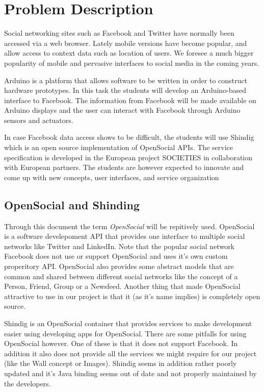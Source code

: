 \section{Problem Description}
Social networking sites such as Facebook and Twitter have normally been accessed  via a web browser. Lately mobile versions have become popular, and allow access to context data such as location of users. We foresee a much bigger popularity of mobile and pervasive interfaces to social media in the coming years. 

Arduino\cite{link:arduino} is a platform that allows software to be written in order to construct hardware 
prototypes. In this task the students will develop an Arduino-based interface to Facebook. The information from 
Facebook will be made available on Arduino displays and the user can interact with Facebook through Arduino sensors and actuators.

In case Facebook data access shows to be difficult, the students will use Shindig\cite{link:shinding} which 
is an open source implementation of OpenSocial APIs. The service specification is developed in the European project 
SOCIETIES in collaboration with European partners. The students are however expected to innovate and come up 
with new concepts, user interfaces, and service organization

\subsection{OpenSocial and Shinding}
Through this document the term {\em OpenSocial}\cite{link:opensocial} will be repitively used. OpenSocial is a software develepoment API that provides
one interface to multiple social networks like Twitter and LinkedIn. Note that the popular social network Facebook does not use
or support OpenSocial and uses it's own custom properitory API. OpenSocial also provides some abstract models that are common
and shared between different social networks like the concept of a Person, Friend, Group or a Newsfeed. Another thing that
made OpenSocial attractive to use in our project is that it (as it's name implies) is completely open source.

Shindig is an OpenSocial container that provides services to make development easier using developing apps for OpenSocial. There are some pitfalls
for using OpenSocial however. One of these is that it does not support Facebook. In addition it also does not provide all the services we might require
for our project (like the Wall concept or Images). Shindig seems in addition rather poorly updated and it's Java binding seems out of date and not properly
maintained by the developers.

